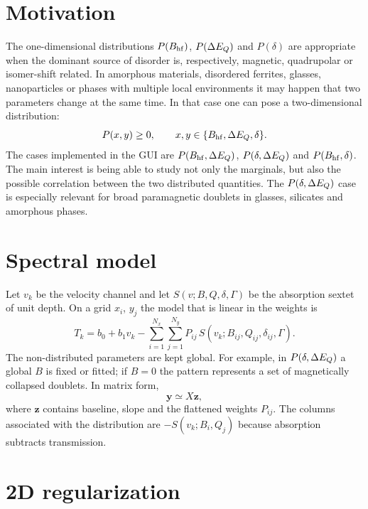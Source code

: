 \section{Motivation}

The one-dimensional distributions $P(B_{\mathrm{hf}})$, $P(\Delta E_Q)$ and $P(\delta)$ are
appropriate when the dominant source of disorder is, respectively, magnetic,
quadrupolar or isomer-shift related. In amorphous materials, disordered
ferrites, glasses, nanoparticles or phases with multiple local environments it
may happen that two parameters change at the same time. In that case one can
pose a two-dimensional distribution:
\begin{equation}
  P(x,y)\ge 0,\qquad x,y\in\{B_{\mathrm{hf}},\Delta E_Q,\delta\}.
\end{equation}
The cases implemented in the GUI are $P(B_{\mathrm{hf}},\Delta E_Q)$, $P(\delta,\Delta E_Q)$ and
$P(B_{\mathrm{hf}},\delta)$. The main interest is being able to study not only the
marginals, but also the possible correlation between the two distributed
quantities. The $P(\delta,\Delta E_Q)$ case is especially relevant for broad
paramagnetic doublets in glasses, silicates and amorphous phases.

\section{Spectral model}

Let $v_k$ be the velocity channel and let $S(v;B,Q,\delta,\Gamma)$ be the
absorption sextet of unit depth. On a grid $x_i$, $y_j$ the model that is linear
in the weights is
\begin{equation}
  T_k = b_0 + b_1 v_k - \sum_{i=1}^{N_x}\sum_{j=1}^{N_y}
  P_{ij}\,S(v_k;B_{ij},Q_{ij},\delta_{ij},\Gamma).
\end{equation}
The non-distributed parameters are kept global. For example, in
$P(\delta,\Delta E_Q)$ a global $B$ is fixed or fitted; if $B=0$ the pattern
represents a set of magnetically collapsed doublets.
In matrix form,
\begin{equation}
  \bm y \simeq X\bm z,
\end{equation}
where $\bm z$ contains baseline, slope and the flattened weights $P_{ij}$. The
columns associated with the distribution are $-S(v_k;B_i,Q_j)$ because
absorption subtracts transmission.

\section{2D regularization}


